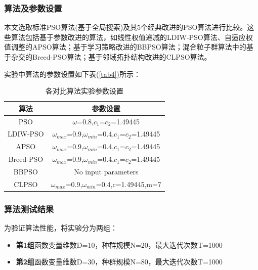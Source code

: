 


\subsubsection{算法及参数设置}
本文选取标准PSO算法(基于全局搜索)及其5个经典改进的PSO算法进行比较。这些算法包括基于参数改进的算法，如线性权值递减的LDIW-PSO算法、自适应权值调整的APSO算法；基于学习策略改进的BBPSO算法；混合粒子群算法中的基于杂交的Breed-PSO算法；基于邻域拓扑结构改进的CLPSO算法。

实验中算法的参数设置如下表(\ref{tab4})所示：

\begin{table}[htbp]
	\centering
	\label{tab4}
	\caption{各对比算法实验参数设置}
	\begin{tabular}{cc}
		\toprule[1.5pt]
		\textbf{算法} & \textbf{参数设置} \\
		\midrule[1pt]
		PSO   & $\omega$=0.8,$ c_1 $=$ c_2 $=1.49445 \\
		LDIW-PSO & $\omega_{max}$=0.9,$\omega_{min}$=0.4,$ c_1 $=$ c_2 $=1.49445 \\
		APSO  & $\omega_{max}$=0.9,$\omega_{min}$=0.4,$ c_1 $=$ c_2 $=1.49445 \\
		Breed-PSO & $\omega_{max}$=0.9,$\omega_{min}$=0.4,$ c_1 $=$ c_2 $=1.49445 \\
		BBPSO & No input parameters \\
		CLPSO & $\omega_{max}$=0.9,$\omega_{min}$=0.4,c=1.49445,m=7 \\
		\bottomrule[1.5pt]
	\end{tabular}%
	\label{tab:addlabel}%
\end{table}%





\subsubsection{算法测试结果}
为验证算法性能，将实验分为两组：
\begin{itemize}
	\item \textbf{第1组}函数变量维数D=10，种群规模N=20，最大迭代次数T=1000
	\item \textbf{第2组}函数变量维数D=30，种群规模N=80，最大迭代次数T=1000
\end{itemize}

